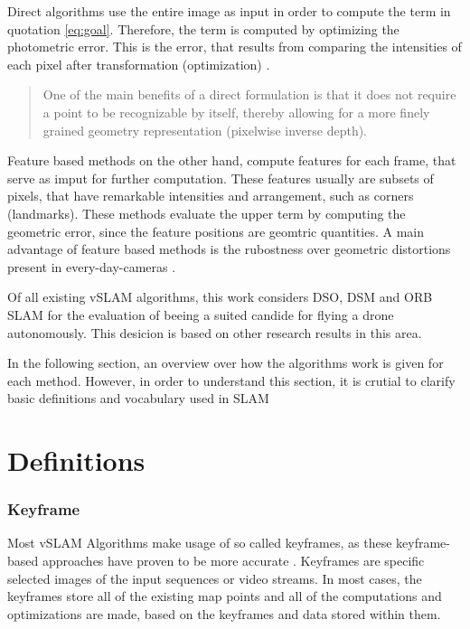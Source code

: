 Direct algorithms use the entire image as input in order to compute the term in quotation \ref{eq:goal}. Therefore, the term is computed by optimizing the photometric error. 
This is the error, that results from comparing the intensities of each pixel after transformation (optimization) \cite{dso}. 

  \begin{quote}
	One of the main benefits of a direct formulation is that it
	does not require a point to be recognizable by itself, thereby
	allowing for a more finely grained geometry representation (pixelwise inverse depth). \cite{dso}
  \end{quote}

Feature based methods on the other hand, compute features for each frame, that serve as imput for further computation. These features usually are subsets of pixels, that have remarkable 
intensities and arrangement, such as corners (landmarks). These methods evaluate the upper term by computing the geometric error, since the feature positions are geomtric 
quantities. A main advantage of feature based methods is the rubostness over geometric distortions present in every-day-cameras \cite{dso}. 

Of all existing vSLAM algorithms, this work considers DSO, DSM and ORB SLAM for the evaluation of beeing a suited candide for flying a drone autonomously. This desicion is based on 
other research results in this area. 



In the following section, an overview over how the algorithms work is given for each method. However, in order to understand this section, it is crutial to clarify basic definitions 
and vocabulary used in SLAM

	\section{Definitions}
		
		\subsubsection{Keyframe}
		
		Most vSLAM Algorithms make usage of so called keyframes, as these keyframe-based approaches have proven to be more accurate \cite{keyframe}.
		Keyframes are specific selected images of the input sequences or video streams. In most cases, the keyframes store all of the existing 
		map points and all of the computations and optimizations are made, based on the keyframes and data stored within them. 
	
